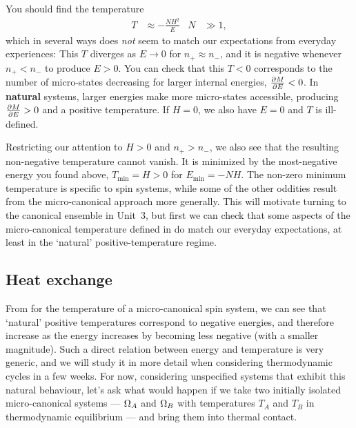 You should find the temperature
\begin{align}
  \label{eq:spin_temp}
  T & \approx -\frac{NH^2}{E} &
  N & \gg 1,
\end{align}
which in several ways does \textit{not} seem to match our expectations from everyday experiences: This $T$ diverges as $E \to 0$ for $n_+ \approx n_-$, and it is negative whenever $n_+ < n_-$ to produce $E > 0$.
You can check that this $T < 0$ corresponds to the number of micro-states decreasing for larger internal energies, $\frac{\partial M}{\partial E} < 0$.
In \textbf{natural} systems, larger energies make more micro-states accessible, producing $\frac{\partial M}{\partial E} > 0$ and a positive temperature.
If $H = 0$, we also have $E = 0$ and $T$ is ill-defined.

Restricting our attention to $H > 0$ and $n_+ > n_-$, we also see that the resulting non-negative temperature cannot vanish.
It is minimized by the most-negative energy you found above, $T_{\text{min}} = H > 0$ for $E_{\text{min}} = -NH$.
The non-zero minimum temperature is specific to spin systems, while some of the other oddities result from the micro-canonical approach more generally.
This will motivate turning to the canonical ensemble in Unit~3, but first we can check that some aspects of the micro-canonical temperature defined in  do match our everyday expectations, at least in the `natural' positive-temperature regime.



\subsection{\label{sec:heat_ex}Heat exchange}
From  for the temperature of a micro-canonical spin system, we can see that `natural' positive temperatures correspond to negative energies, and therefore increase as the energy increases by becoming less negative (with a smaller magnitude).
Such a direct relation between energy and temperature is very generic, and we will study it in more detail when considering thermodynamic cycles in a few weeks.
For now, considering unspecified systems that exhibit this natural behaviour, let's ask what would happen if we take two initially isolated micro-canonical systems --- $\Omega_A$ and $\Omega_B$ with temperatures $T_A$ and $T_B$ in thermodynamic equilibrium --- and bring them into thermal contact.

